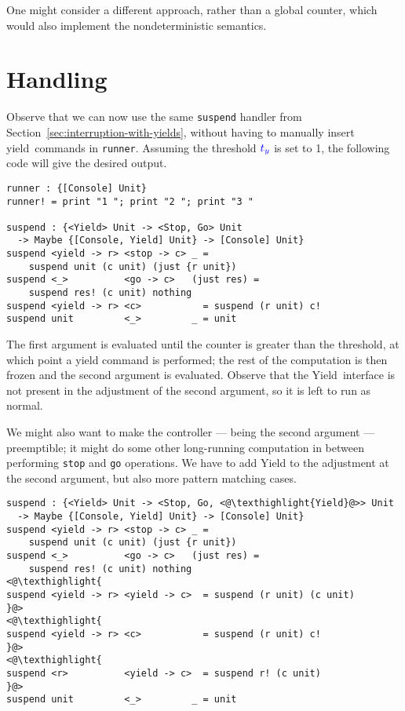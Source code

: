 \documentclass[msc,deptreport,cs]{infthesis} %
\newcommand{\code}[1]{\lstinline{#1}}
\newcommand{\texthighlight}[1]{%
  \colorbox{red!20}{#1}}
\newcommand{\threshc}{{\color{blue} t_y}}
\newcommand\yield{\textsf{yield}\xspace}
\newcommand\Yield{\textsf{Yield}\xspace}
\begin{document}
One might consider a different approach, rather than a global counter, which
would also implement the nondeterministic semantics.

\section{Handling}
\label{sec:handling}

Observe that we can now use the same \code{suspend} handler from
Section~\ref{sec:interruption-with-yields}, without having to manually insert
\yield~commands in \code{runner}. Assuming the threshold $\threshc$ is set to 1, the
following code will give the desired output.

\begin{lstlisting}
runner : {[Console] Unit}
runner! = print "1 "; print "2 "; print "3 "

suspend : {<Yield> Unit -> <Stop, Go> Unit
  -> Maybe {[Console, Yield] Unit} -> [Console] Unit}
suspend <yield -> r> <stop -> c> _ =
    suspend unit (c unit) (just {r unit})
suspend <_>          <go -> c>   (just res) =
    suspend res! (c unit) nothing
suspend <yield -> r> <c>           = suspend (r unit) c!
suspend unit         <_>         _ = unit
\end{lstlisting}

The first argument is evaluated until the counter is greater than the threshold,
at which point a yield command is performed; the rest of the computation is then
frozen and the second argument is evaluated. Observe that the \Yield~interface
is not present in the adjustment of the second argument, so it is left to run
as normal.

We might also want to make the controller --- being the second argument ---
preemptible; it might do some other long-running computation in between
performing \code{stop} and \code{go} operations. We have to add \Yield to the
adjustment at the second argument, but also more pattern matching cases.

\begin{lstlisting}[]
suspend : {<Yield> Unit -> <Stop, Go, <@\texthighlight{Yield}@>> Unit
  -> Maybe {[Console, Yield] Unit} -> [Console] Unit}
suspend <yield -> r> <stop -> c> _ =
    suspend unit (c unit) (just {r unit})
suspend <_>          <go -> c>   (just res) =
    suspend res! (c unit) nothing
<@\texthighlight{
suspend <yield -> r> <yield -> c>  = suspend (r unit) (c unit)
}@>
<@\texthighlight{
suspend <yield -> r> <c>           = suspend (r unit) c!
}@>
<@\texthighlight{
suspend <r>          <yield -> c>  = suspend r! (c unit)
}@>
suspend unit         <_>         _ = unit
\end{lstlisting}
\end{document}
